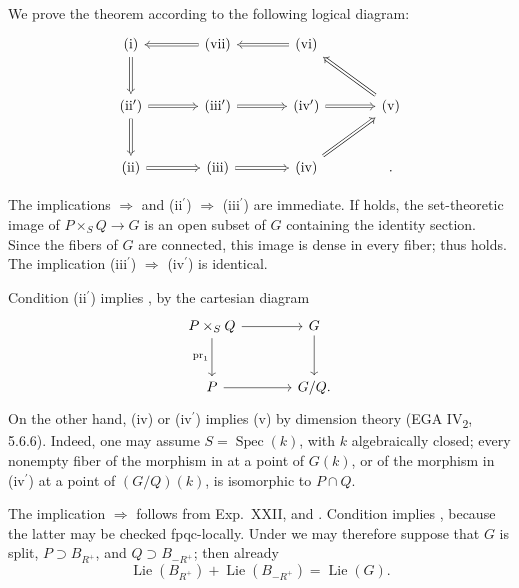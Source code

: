 \SGAProof
We prove the theorem according to the following logical diagram:
\[
\begin{tikzcd}[column sep=large,row sep=large]
 \textup{(i)} \arrow[d,Rightarrow] &
 \textup{(vii)} \arrow[l,Rightarrow] &
 \textup{(vi)} \arrow[l,Rightarrow] \\
 \textup{(ii\(^{\prime}\))} \arrow[d,Rightarrow] \arrow[r,Rightarrow] &
 \textup{(iii\(^{\prime}\))} \arrow[r,Rightarrow] &
 \textup{(iv\(^{\prime}\))} \arrow[r,Rightarrow] &
 \textup{(v)} \arrow[ul,Rightarrow] \\
 \textup{(ii)} \arrow[r,Rightarrow] &
 \textup{(iii)} \arrow[r,Rightarrow] &
 \textup{(iv)} \arrow[ur,Rightarrow] &
 {} .
\end{tikzcd}
\]

The implications \textup{} \(\Rightarrow\) \textup{} and
\textup{(ii\(^{\prime}\))} \(\Rightarrow\)
\textup{(iii\(^{\prime}\))} are immediate.  If \textup{} holds,
the set-theoretic image of \(P\times_SQ\to G\) is an open subset of
\(G\) containing the identity section.  Since the fibers of \(G\) are
connected, this image is dense in every fiber; thus \textup{}
holds.  The implication
\textup{(iii\(^{\prime}\))} \(\Rightarrow\)
\textup{(iv\(^{\prime}\))} is identical.

Condition \textup{(ii\(^{\prime}\))} implies \textup{}, by the
cartesian diagram
\[
\begin{tikzcd}[column sep=large,row sep=large]
 P\times_SQ \arrow[r] \arrow[d,"\operatorname{pr}_1"'] & G \arrow[d]\\
 P \arrow[r] & G/Q .
\end{tikzcd}
\]
On the other hand, \textup{(iv)} or \textup{(iv\(^{\prime}\))}
implies \textup{(v)} by dimension theory (EGA
IV\textsubscript{2}, 5.6.6).  Indeed, one may assume
\(S=\operatorname{Spec}(k)\), with \(k\) algebraically closed; every
nonempty fiber of the morphism in \textup{} at a point of \(G(k)\),
or of the morphism in \textup{(iv\(^{\prime}\))} at a point of
\((G/Q)(k)\), is isomorphic to \(P\cap Q\).

The implication \textup{} \(\Rightarrow\) \textup{} follows
from Exp.\ XXII,  \textup{} and .  Condition
\textup{} implies \textup{}, because the latter may be checked
fpqc-locally.  Under \textup{} we may therefore suppose that
\(G\) is split, \(P\supset B_{R^+}\), and
\(Q\supset B_{-R^+}\); then already
\[
 \operatorname{Lie}(B_{R^+})+\operatorname{Lie}(B_{-R^+})
 =\operatorname{Lie}(G).
\]

